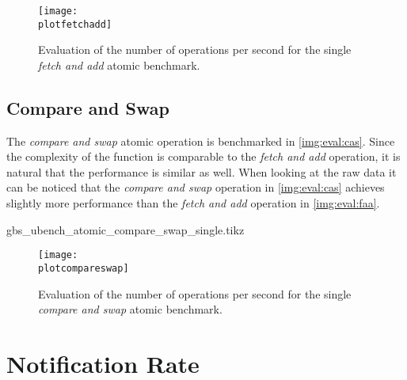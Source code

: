 \begin{figure}[htb]
\centering
\texttt{[image: \\plotfetchadd]}
\caption{Evaluation of the number of operations per second for the single \emph{fetch and add} atomic benchmark.}
\label{img:eval:faa}
\end{figure}

\subsection{Compare and Swap}

The \emph{compare and swap} atomic operation is benchmarked in \autoref{img:eval:cas}. Since the complexity of the function is comparable to the \emph{fetch and add} operation, it is natural that the performance is similar as well. When looking at the raw data it can be noticed that the \emph{compare and swap} operation in \autoref{img:eval:cas} achieves slightly more performance than the \emph{fetch and add} operation in \autoref{img:eval:faa}.


\newcommand{\plotcompareswap}{gbs_ubench_atomic_compare_swap_single.tikz}
\begin{filecontents}{\plotcompareswap}

\datatable
{}
\end{filecontents}

\begin{figure}[htb]
\centering
\texttt{[image: \\plotcompareswap]}
\caption{Evaluation of the number of operations per second for the single \emph{compare and swap} atomic benchmark.}
\label{img:eval:cas}
\end{figure}

\section{Notification Rate}

